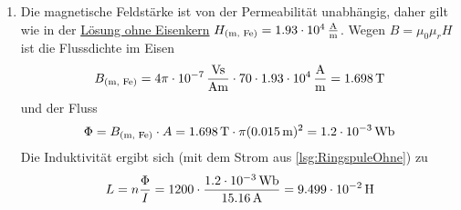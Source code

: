 \documentclass[a4paper]{scrartcl}
\begin{document}
\begin{enumerate}[noitemsep]
  \item Die magnetische Feldstärke ist von der Permeabilität unabhängig, daher gilt wie in der \hyperref[lsg:RingspuleOhne]{Lösung ohne Eisenkern} $H_\text{(m, Fe)} = \unit[1.93\cdot 10^4]{\frac{A}{m}}$. Wegen $B = \mu_0 \mu_r H$ ist die Flussdichte im Eisen
    \begin{equation*}
      B_\text{(m, Fe)} = \unit[4\pi \cdot 10^{-7}]{\frac{Vs}{Am}} \cdot 70 \cdot \unit[1.93\cdot 10^4]{\frac{A}{m}} = \unit[1.698]{T}
    \end{equation*}
    und der Fluss
    \begin{equation*}
      \Phi = B_\text{(m, Fe)} \cdot A = \unit[1.698]{T} \cdot \pi (\unit[0.015]{m})^2 = \unit[1.2 \cdot 10^{-3}]{Wb}
    \end{equation*}
    Die Induktivität ergibt sich (mit dem Strom aus \ref{lsg:RingspuleOhne}) zu
    \begin{equation*}
      L = n \frac{\Phi}{I} = 1200 \cdot \frac{\unit[1.2 \cdot 10^{-3}]{Wb}}{\unit[15.16]{A}} = \unit[9.499 \cdot 10^{-2}]{H}
    \end{equation*}


\end{enumerate}
\end{document}
